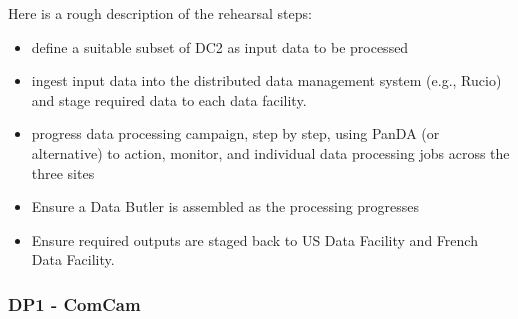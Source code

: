 Here is a rough description of the rehearsal steps:

\begin{itemize}

\item define a suitable subset of DC2 as input data to be processed

\item ingest input data into the distributed data management system (e.g., Rucio) and stage required data to each data facility.

\item progress data processing campaign, step by step, using PanDA (or alternative) to action, monitor, and individual data processing jobs across the three sites

\item Ensure a Data Butler is assembled as the processing progresses

\item Ensure required outputs are staged back to US Data Facility and French Data Facility.

\end{itemize}

\subsubsection{ \gls{DP1} - ComCam}

